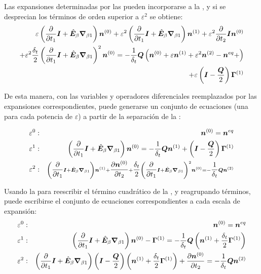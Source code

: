 Las expansiones determinadas por las  pueden incorporarse a la , y si se desprecian los t\'erminos de orden superior a $\varepsilon^2$ se obtiene:
\begin{equation}
	\begin{aligned}
		\varepsilon \left( \dfrac{\partial}{\partial t_1}\bm{I} + \hat{\bm{E}}_{\beta} \bm{\nabla}_{\beta 1} \right) \bm{n}^{(0)} + \varepsilon^2 \left( \dfrac{\partial}{\partial t_1}\bm{I} + \hat{\bm{E}}_{\beta} \bm{\nabla}_{\beta 1} \right) \bm{n}^{(1)} + \varepsilon^2 \dfrac{\partial}{\partial t_2} \bm{I} \bm{n}^{(0)} \\
		+ \varepsilon^2 \dfrac{\delta_t}{2} \left( \dfrac{\partial}{\partial t_1}\bm{I} + \hat{\bm{E}}_{\beta} \bm{\nabla}_{\beta 1} \right)^2 \bm{n}^{(0)} = -\dfrac{1}{\delta_t} \bm{Q} \left( \bm{n}^{(0)} + \varepsilon \bm{n}^{(1)} + \varepsilon^2 \bm{n}^{(2)} - \bm{n}^{eq} +  \right) \\
		+ \varepsilon \left( \bm{I}-\dfrac{\bm{Q}}{2}\right) \bm{\Gamma}^{(1)}
	\end{aligned}
	\label{eq:modelo_2d_escalas}
\end{equation}

De esta manera, con las variables y operadores diferenciales reemplazados por las expansiones correspondientes, puede generarse un conjunto de ecuaciones (una para cada potencia de $\varepsilon$) a partir de la separaci\'on de la :

\begin{subequations}
	\begin{align}
		\varepsilon^0: && \bm{n}^{(0)} = \bm{n}^{eq}\\
		\varepsilon^1: && \left( \dfrac{\partial}{\partial t_1}\bm{I} + \hat{\bm{E}}_{\beta} \bm{\nabla}_{\beta 1} \right) \bm{n}^{(0)} = -\dfrac{1}{\delta_t} \bm{Q} \bm{n}^{(1)} + \left( \bm{I}-\dfrac{\bm{Q}}{2}\right) \bm{\Gamma}^{(1)} \label{eq:eps_1_0}\\	
		\varepsilon^2: && {\scriptstyle \left( \dfrac{\partial}{\partial t_1}\bm{I} + \hat{\bm{E}}_{\beta} \bm{\nabla}_{\beta 1} \right) \bm{n}^{(1)} + \dfrac{\partial \bm{n}^{(0)}}{\partial t_2}  + \dfrac{\delta_t}{2} \left( \dfrac{\partial}{\partial t_1}\bm{I} + \hat{\bm{E}}_{\beta} \bm{\nabla}_{\beta 1} \right)^2 \bm{n}^{(0)}  = -\dfrac{1}{\delta_t} \bm{Q} \bm{n}^{(2)}} \label{eq:eps_2_0}
	\end{align}
\end{subequations}


Usando la  para reescribir el t\'ermino cuadr\'atico de la , y reagrupando t\'erminos, puede escribirse el conjunto de ecuaciones correspondientes a cada escala de expansi\'on:
\begin{subequations}
	\begin{align}
		\varepsilon^0: && \bm{n}^{(0)} = \bm{n}^{eq} \label{eq:eps_0}\\
		\varepsilon^1: && \left( \dfrac{\partial}{\partial t_1}\bm{I} + \hat{\bm{E}}_{\beta} \bm{\nabla}_{\beta 1} \right) \bm{n}^{(0)} - \bm{\Gamma}^{(1)} = -\dfrac{1}{\delta_t} \bm{Q} \left( \bm{n}^{(1)} + \dfrac{\delta_t}{2} \bm{\Gamma}^{(1)} \right)  \label{eq:eps_1}\\
		\varepsilon^2: && \left( \dfrac{\partial}{\partial t_1}\bm{I} + \hat{\bm{E}}_{\beta} \bm{\nabla}_{\beta 1} \right) \left( \bm{I}-\dfrac{\bm{Q}}{2}\right) \left( \bm{n}^{(1)} + \dfrac{\delta_t}{2} \bm{\Gamma}^{(1)} \right) + \dfrac{\partial \bm{n}^{(0)}}{\partial t_2}  =  -\dfrac{1}{\delta_t} \bm{Q} \bm{n}^{(2)} \label{eq:eps_2}
	\end{align}
	\label{eq:modelo_2d_escalas}
\end{subequations}

